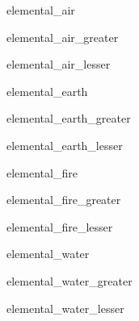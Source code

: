 \documentclass[letterpaper,serif]{module}
\begin{document}
\begin{newmonster}{elemental_air}\end{newmonster}

\begin{newmonster}{elemental_air_greater}\end{newmonster}

\begin{newmonster}{elemental_air_lesser}\end{newmonster}

\begin{newmonster}{elemental_earth}\end{newmonster}

\begin{newmonster}{elemental_earth_greater}\end{newmonster}

\begin{newmonster}{elemental_earth_lesser}\end{newmonster}

\begin{newmonster}{elemental_fire}\end{newmonster}

\begin{newmonster}{elemental_fire_greater}\end{newmonster}

\begin{newmonster}{elemental_fire_lesser}\end{newmonster}

\begin{newmonster}{elemental_water}\end{newmonster}

\begin{newmonster}{elemental_water_greater}\end{newmonster}

\begin{newmonster}{elemental_water_lesser}\end{newmonster}
\end{document}
